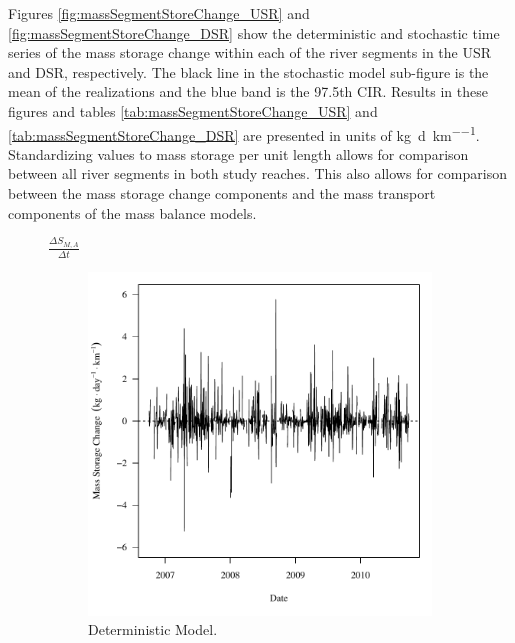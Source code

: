 Figures \ref{fig:massSegmentStoreChange_USR} and \ref{fig:massSegmentStoreChange_DSR} show the deterministic and stochastic time series of the mass storage change within each of the river segments in the USR and DSR, respectively.  The black line in the stochastic model sub-figure is the mean of the realizations and the blue band is the 97.5th CIR.   Results in these figures and tables \ref{tab:massSegmentStoreChange_USR} and \ref{tab:massSegmentStoreChange_DSR} are presented in units of \si{\kilo\gram\per\day\per\kilo\meter}.  Standardizing values to mass storage per unit length allows for comparison between all river segments in both study reaches.  This also allows for comparison between the mass storage change components and the mass transport components of the mass balance models.

\subfiguretop
\begin{landscape}
	\begin{figure}
		$ \displaystyle \frac{\Delta S_{M,A}}{\Delta t} $
		\begin{subfigure}{0.7\textwidth}
			\centering
			\includegraphics[width=\tableCustomSize]{"Figures/Results_USR/Deterministic/f Segment A"}
			\caption{Deterministic Model.}
		\end{subfigure}%
		\begin{subfigure}{0.7\textwidth}
			\centering

\end{subfigure}
\end{figure}
\end{landscape}
